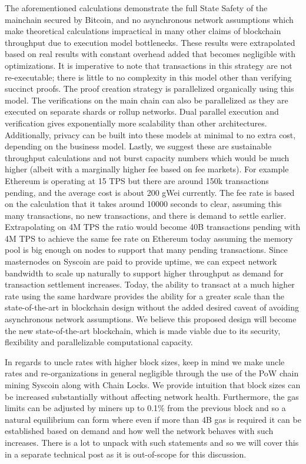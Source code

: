 \documentclass[peerreview]{ieeesyscoin}
\begin{document}
The aforementioned calculations demonstrate the full State Safety of the mainchain secured by Bitcoin, and no asynchronous network assumptions which make theoretical calculations impractical in many other claims of blockchain throughput due to execution model bottlenecks. These results were extrapolated based on real results with constant overhead added that becomes negligible with optimizations. It is imperative to  note that transactions in this strategy are not re-executable; there is little to no complexity in this model other than verifying succinct proofs. The proof creation strategy is parallelized organically using this model. The verifications on the main chain can also be parallelized as they are executed on separate shards or rollup networks. Dual parallel execution and verification gives exponentially more scalability than other architectures. Additionally, privacy can be built into these models at minimal to no extra cost, depending on the business model. Lastly, we suggest  these are sustainable throughput calculations and not burst capacity numbers which would be much higher (albeit with a marginally higher fee based on fee markets). For example Ethereum is operating at 15 TPS but there are around 150k transactions pending, and the average cost is about 200 gWei currently. The fee rate is based on the calculation that it  takes around 10000 seconds to clear, assuming this many transactions, no new transactions, and there is demand to settle earlier. Extrapolating on 4M TPS the ratio would become 40B transactions pending with 4M TPS to achieve the same fee rate on Ethereum today assuming the memory pool is big enough on nodes to support that many pending transactions. Since masternodes on Syscoin are paid to provide uptime, we can expect network bandwidth to scale up naturally to support higher throughput as demand for transaction settlement increases. Today, the ability to transact at a much higher rate using the same hardware provides the ability for a greater scale than the state-of-the-art in blockchain design without the added desired caveat of avoiding asynchronous network assumptions. We believe this proposed design will become the new state-of-the-art blockchain, which is made viable due to its security, flexibility and parallelizable computational capacity.

In regards to uncle rates with higher block sizes, keep in mind we make uncle rates and re-organizations in general negligible through the use of the PoW chain mining Syscoin along with Chain Locks. We provide intuition that block sizes can be increased substantially without affecting network health. Furthermore, the gas limits can be adjusted by miners up to 0.1\% from the previous block and so a natural equilibrium can form where even if more than 4B gas is required it can be established based on demand and how well the network behaves with such increases. There is a lot to unpack with such statements and so we will cover this in a separate technical post as it is out-of-scope for this discussion.
\end{document}

